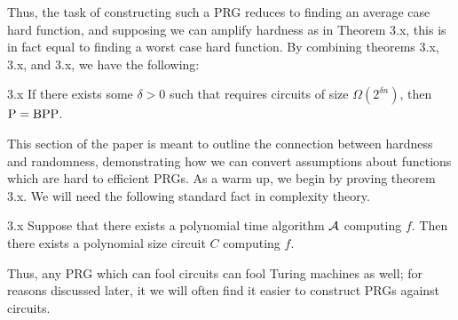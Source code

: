 \documentclass[11pt]{article}
\begin{document}
Thus, the task of constructing such a PRG reduces to finding an average case hard function, and supposing we can amplify hardness as in Theorem 3.x, this is in fact equal to finding a worst case hard function. By combining theorems 3.x, 3.x, and 3.x, we have the following:

\begin{corollary}{3.x}
    If there exists some $\delta > 0$ such that \SAT{} requires circuits of size $\Omega(2^{\delta n})$, then $\mathrm{P} = \mathrm{BPP}$.
\end{corollary}

This section of the paper is meant to outline the connection between hardness and randomness, demonstrating how we can convert assumptions about functions which are hard to efficient PRGs. As a warm up, we begin by proving theorem 3.x. We will need the following standard fact in complexity theory.

\begin{fact}{3.x}
    Suppose that there exists a polynomial time algorithm $\mathcal{A}$ computing $f$. Then there exists a polynomial size circuit $C$ computing $f$.
\end{fact}

Thus, any PRG which can fool circuits can fool Turing machines as well; for reasons discussed later, it we will often find it easier to construct PRGs against circuits.
\end{document}
